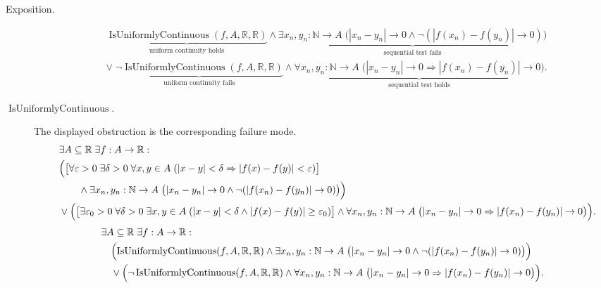 \begin{remark*}
\begin{description}
  \item[Exposition.]
\[
\begin{aligned}
&\underbrace{\operatorname{IsUniformlyContinuous}(f,A,\mathbb R,\mathbb R)}_{\text{uniform continuity holds}}
\land
\underbrace{\exists x_n,y_n:\mathbb{N}\to A\;
\bigl(|x_n - y_n| \to 0 \land \neg(|f(x_n) - f(y_n)| \to 0)\bigr)}_{\text{sequential test fails}}\\
&\lor\;
\underbrace{\neg \operatorname{IsUniformlyContinuous}(f,A,\mathbb R,\mathbb R)}_{\text{uniform continuity fails}}
\land
\underbrace{\forall x_n,y_n:\mathbb{N}\to A\;
\bigl(|x_n - y_n| \to 0 \Rightarrow |f(x_n) - f(y_n)| \to 0\bigr)}_{\text{sequential test holds}}.
\end{aligned}
\]


  \item[\(\operatorname{IsUniformlyContinuous}.\)]
  The displayed obstruction is the corresponding failure mode.
  \[
\begin{aligned}
&\exists A \subseteq \mathbb{R}\;\exists f:A \to \mathbb{R}:\\
\quad &\Bigl(
\bigl[\forall \varepsilon>0\;\exists \delta>0\;\forall x,y\in A\;
(|x-y|<\delta\Rightarrow |f(x)-f(y)|<\varepsilon)\bigr]\\
&\qquad\land \exists x_n,y_n:\mathbb{N}\to A\;
\bigl(|x_n - y_n| \to 0 \land \neg(|f(x_n) - f(y_n)| \to 0)\bigr)\Bigr)\\
\quad &\lor \Bigl(
\bigl[\exists \varepsilon_0>0\;\forall \delta>0\;\exists x,y\in A\;
(|x-y|<\delta\land |f(x)-f(y)|\ge\varepsilon_0)\bigr]\land
\forall x_n,y_n:\mathbb{N}\to A\;
\bigl(|x_n - y_n| \to 0 \Rightarrow |f(x_n) - f(y_n)| \to 0\bigr)\Bigr).
\end{aligned}
  \]
  \[
\begin{aligned}
&\exists A \subseteq \mathbb{R}\;\exists f:A \to \mathbb{R}:\\
&\quad \Bigl(\operatorname{IsUniformlyContinuous}(f,A,\mathbb R,\mathbb R) \land \exists x_n,y_n:\mathbb{N}\to A\;
\bigl(|x_n - y_n| \to 0 \land \neg(|f(x_n) - f(y_n)| \to 0)\bigr)\Bigr)\\
&\quad \lor \Bigl(\neg \operatorname{IsUniformlyContinuous}(f,A,\mathbb R,\mathbb R) \land
\forall x_n,y_n:\mathbb{N}\to A\;
\bigl(|x_n - y_n| \to 0 \Rightarrow |f(x_n) - f(y_n)| \to 0\bigr)\Bigr).
\end{aligned}
  \]
\end{description}
\end{remark*}

